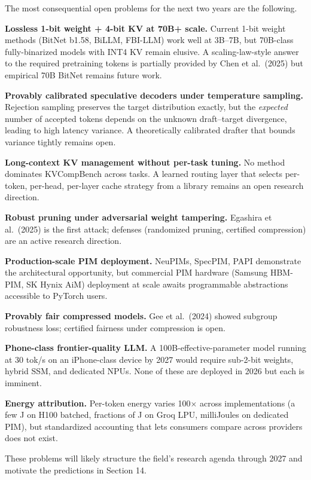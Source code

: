 \documentclass{article}
\begin{document}
The most consequential open problems for the next two years are the following.

\textbf{Lossless 1-bit weight + 4-bit KV at 70B+ scale.} Current 1-bit weight methods (BitNet b1.58, BiLLM, FBI-LLM) work well at 3B--7B, but 70B-class fully-binarized models with INT4 KV remain elusive. A scaling-law-style answer to the required pretraining tokens is partially provided by Chen et al.~(2025) but empirical 70B BitNet remains future work.

\textbf{Provably calibrated speculative decoders under temperature sampling.} Rejection sampling preserves the target distribution exactly, but the \emph{expected} number of accepted tokens depends on the unknown draft--target divergence, leading to high latency variance. A theoretically calibrated drafter that bounds variance tightly remains open.

\textbf{Long-context KV management without per-task tuning.} No method dominates KVCompBench across tasks. A learned routing layer that selects per-token, per-head, per-layer cache strategy from a library remains an open research direction.

\textbf{Robust pruning under adversarial weight tampering.} Egashira et al.~(2025) is the first attack; defenses (randomized pruning, certified compression) are an active research direction.

\textbf{Production-scale PIM deployment.} NeuPIMs, SpecPIM, PAPI demonstrate the architectural opportunity, but commercial PIM hardware (Samsung HBM-PIM, SK Hynix AiM) deployment at scale awaits programmable abstractions accessible to PyTorch users.

\textbf{Provably fair compressed models.} Gee et al.~(2024) showed subgroup robustness loss; certified fairness under compression is open.

\textbf{Phone-class frontier-quality LLM.} A 100B-effective-parameter model running at 30 tok/s on an iPhone-class device by 2027 would require sub-2-bit weights, hybrid SSM, and dedicated NPUs. None of these are deployed in 2026 but each is imminent.

\textbf{Energy attribution.} Per-token energy varies 100× across implementations (a few J on H100 batched, fractions of J on Groq LPU, milliJoules on dedicated PIM), but standardized accounting that lets consumers compare across providers does not exist.

These problems will likely structure the field's research agenda through 2027 and motivate the predictions in Section 14.
\end{document}
